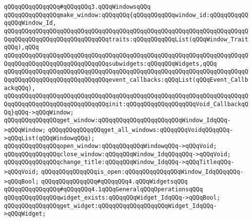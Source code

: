 \verb|qQQqqQQqqQQqqQQq#qQQqqQQq3.qQQqWindowsqQQq|\newline
\newline
\verb|qQQqqQQqqQQqqQQqmake_window:qQQqqQQq{qQQqqQQqqQQqwindow_id:qQQqqQQqqQQqqQQqWindow_Id,|\newline
\verb|qQQqqQQqqQQqqQQqqQQqqQQqqQQqqQQqqQQqqQQqqQQqqQQqqQQqqQQqqQQqqQQqqQQqqQQqqQQqqQQqqQQqqQQqqQQqqQQqqQQqtraits:qQQqqQQqqQQqList(qQQqWindow_TraitqQQq),qQQq|\newline
\verb|qQQqqQQqqQQqqQQqqQQqqQQqqQQqqQQqqQQqqQQqqQQqqQQqqQQqqQQqqQQqqQQqqQQqqQQqqQQqqQQqqQQqqQQqqQQqqQQqqQQqsubwidgets:qQQqqQQqWidgets,qQQq|\newline
\verb|qQQqqQQqqQQqqQQqqQQqqQQqqQQqqQQqqQQqqQQqqQQqqQQqqQQqqQQqqQQqqQQqqQQqqQQqqQQqqQQqqQQqqQQqqQQqqQQqqQQqevent_callbacks:qQQqList(qQQqEvent_CallbackqQQq),|\newline
\verb|qQQqqQQqqQQqqQQqqQQqqQQqqQQqqQQqqQQqqQQqqQQqqQQqqQQqqQQqqQQqqQQqqQQqqQQqqQQqqQQqqQQqqQQqqQQqqQQqqQQqinit:qQQqqQQqqQQqqQQqqQQqVoid_CallbackqQQq}qQQq->qQQqWindow;|\newline
\newline
\verb|qQQqqQQqqQQqqQQqget_window:qQQqqQQqqQQqqQQqqQQqqQQqWindow_IdqQQq->qQQqWindow;|\newline
\verb|qQQqqQQqqQQqqQQqget_all_windows:qQQqqQQqVoidqQQqqQQq->qQQqList(qQQqWindowqQQq);|\newline
\newline
\verb|qQQqqQQqqQQqqQQqopen_window:qQQqqQQqqQQqWindowqQQq->qQQqVoid;|\newline
\verb|qQQqqQQqqQQqqQQqclose_window:qQQqqQQqWindow_IdqQQqqQQq->qQQqVoid;|\newline
\verb|qQQqqQQqqQQqqQQqchange_title:qQQqqQQqWindow_IdqQQq->qQQqTitleqQQq->qQQqVoid;|\newline
\verb|qQQqqQQqqQQqqQQqis_open:qQQqqQQqqQQqqQQqWindow_IdqQQqqQQq->qQQqBool;|\newline
\newline
\newline
\verb|qQQqqQQqqQQqqQQq#qQQqqQQq4.qQQqWidgetsqQQq|\newline
\newline
\verb|qQQqqQQqqQQqqQQq#qQQqqQQq4.1qQQqGeneralqQQqOperationsqQQq|\newline
\newline
\verb|qQQqqQQqqQQqqQQqwidget_exists:qQQqqQQqWidget_IdqQQq->qQQqBool;|\newline
\verb|qQQqqQQqqQQqqQQqget_widget:qQQqqQQqqQQqqQQqqQQqWidget_IdqQQq->qQQqWidget;|\newline
